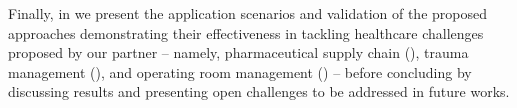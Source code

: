 Finally, in  we present the application scenarios and validation of the proposed approaches demonstrating their effectiveness in tackling healthcare challenges proposed by our partner \ausl{}
-- namely, pharmaceutical supply chain (), trauma management (), and operating room management () --
before concluding by discussing results and presenting open challenges to be addressed in future works.